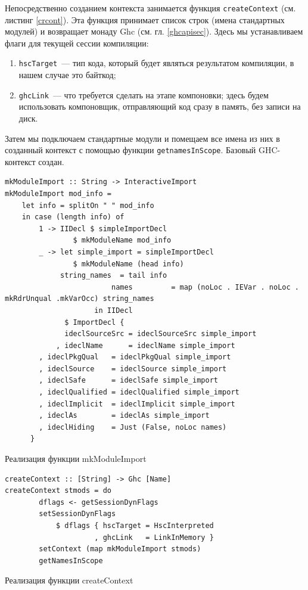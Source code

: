 		Непосредственно созданием контекста занимается функция \lstinline!createContext! (см. листинг \ref{crcont}). Эта функция принимает список строк (имена стандартных модулей) и возвращает монаду Ghc (см. гл. \ref{ghcapisec}). Здесь мы устанавливаем флаги для текущей сессии компиляции:
		\begin{enumerate}[1)]
			\item \lstinline!hscTarget!~--- тип кода, который будет являться результатом компиляции, в нашем случае это байткод;
			\item \lstinline!ghcLink!~--- что требуется сделать на этапе компоновки; здесь будем использовать компоновщик, отправляющий код сразу в память, без записи на диск.
		\end{enumerate}
	
		Затем мы подключаем стандартные модули и помещаем все имена из них в созданный контекст с помощью функции \lstinline!getnamesInScope!. Базовый GHC-контекст создан.
		
		\begin{ListingEnv}[h]
		\begin{lstlisting}
mkModuleImport :: String -> InteractiveImport
mkModuleImport mod_info = 
	let info = splitOn " " mod_info
 	in case (length info) of
		1 -> IIDecl $ simpleImportDecl 
			    $ mkModuleName mod_info
		_ -> let simple_import = simpleImportDecl 
			    $ mkModuleName (head info)
			 string_names  = tail info
                         names         = map (noLoc . IEVar . noLoc . mkRdrUnqual .mkVarOcc) string_names
                     in IIDecl 
              $ ImportDecl { 
              ideclSourceSrc = ideclSourceSrc simple_import
            , ideclName      = ideclName simple_import
	    , ideclPkgQual   = ideclPkgQual simple_import
	    , ideclSource    = ideclSource simple_import
	    , ideclSafe      = ideclSafe simple_import
	    , ideclQualified = ideclQualified simple_import
	    , ideclImplicit  = ideclImplicit simple_import
	    , ideclAs        = ideclAs simple_import
	    , ideclHiding    = Just (False, noLoc names) 
	  }
		\end{lstlisting}
		\caption{Реализация функции mkModuleImport} \label{mkmod}
		\end{ListingEnv}
	
		\begin{ListingEnv}[h]
		\begin{lstlisting}
createContext :: [String] -> Ghc [Name]
createContext stmods = do
		dflags <- getSessionDynFlags
		setSessionDynFlags 
			$ dflags { hscTarget = HscInterpreted
			         , ghcLink   = LinkInMemory }
		setContext (map mkModuleImport stmods)
		getNamesInScope
		\end{lstlisting}
		\caption{Реализация функции createContext} \label{crcont}
		\end{ListingEnv}
		
